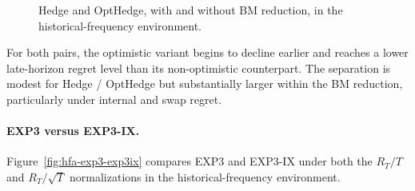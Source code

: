 \begin{figure}[H]
    \caption{Hedge and OptHedge, with and without BM reduction, in the historical-frequency environment.}
    \label{fig:hfa-optimistic-comparison}
\end{figure}

For both pairs, the optimistic variant begins to decline earlier and reaches a
lower late-horizon regret level than its non-optimistic counterpart. The
separation is modest for Hedge / OptHedge but substantially larger within the
BM reduction, particularly under internal and swap regret.


\paragraph{EXP3 versus EXP3-IX.}

Figure~\ref{fig:hfa-exp3-exp3ix} compares EXP3 and EXP3-IX under both the
\(R_T/T\) and \(R_T/\sqrt{T}\) normalizations in the historical-frequency
environment.


